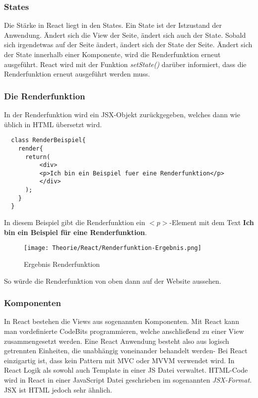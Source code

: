 \subsubsection{States}
Die Stärke in React liegt in den States. Ein State ist der Istzustand der Anwendung. Ändert sich 
die View der Seite, ändert sich auch der State. Sobald sich irgendetwas auf der Seite ändert, 
ändert sich der State der Seite. Ändert sich der State innerhalb einer Komponente, wird die 
Renderfunktion erneut ausgeführt. React wird mit der Funktion \textit{setState()} darüber informiert,
dass die Renderfunktion erneut ausgeführt werden muss.

\subsubsection{Die Renderfunktion}
In der Renderfunktion wird ein JSX-Objekt zurückgegeben, welches dann wie üblich in HTML
übersetzt wird. 

\begin{lstlisting}
  class RenderBeispiel{
    render{
      return(
          <div>
          <p>Ich bin ein Beispiel fuer eine Renderfunktion</p>
          </div>
      );
    }
  }
\end{lstlisting}

In diesem Beispiel gibt die Renderfunktion ein $<p>$-Element mit dem Text \textbf{Ich bin ein 
Beispiel für eine Renderfunktion}. 

\begin{figure}[H]
  \begin{center}
    \texttt{[image: Theorie/React/Renderfunktion-Ergebnis.png]}
    \caption{Ergebnis Renderfunktion}
  \end{center}
\end{figure}

So würde die Renderfunktion von oben dann auf der Website aussehen.


\subsubsection{Komponenten}
In React bestehen die Views aus sogenannten Komponenten. Mit React kann man vordefinierte CodeBits 
programmieren, welche anschließend zu einer View zusammengesetzt werden. Eine React Anwendung 
besteht also aus logisch getrennten Einheiten, die unabhängig voneinander behandelt werden-
Bei React einzigartig ist, dass kein Pattern mit MVC oder MVVM verwendet wird. In React Logik als 
sowohl auch Template in einer JS Datei verwaltet.
HTML-Code wird in React in einer JavaScript Datei geschrieben im sogenannten \textit{JSX-Format}. 
JSX ist HTML jedoch sehr ähnlich.\cite{Komp}


